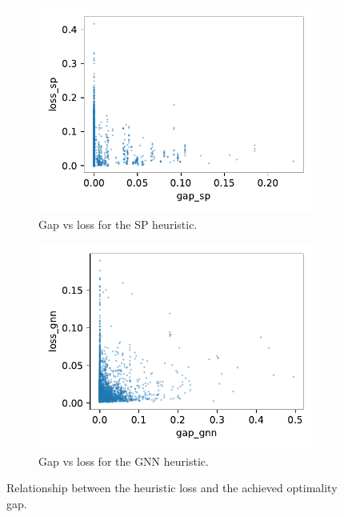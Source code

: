 \documentclass[english, 12pt, a4paper, sci, utf8, a-2b, online]{aaltothesis}
\begin{document}
\begin{figure}[t]
    \begin{subfigure}{0.5\textwidth}
        \centering
        \includegraphics[width=\linewidth]{figures/gap-loss-trivial.pdf}
        \caption{Gap vs loss for the SP heuristic.}
        \label{fig:gap-loss-trivial}
    \end{subfigure}
    \begin{subfigure}{0.5\textwidth}
        \centering
        \includegraphics[width=\linewidth]{figures/gap-loss-gnn.pdf}
        \caption{Gap vs loss for the GNN heuristic.}
        \label{fig:gap-loss-gnn}
    \end{subfigure}
    \caption{Relationship between the heuristic loss and the achieved optimality gap.}
    \label{fig:gap-loss}
\end{figure}
\end{document}
